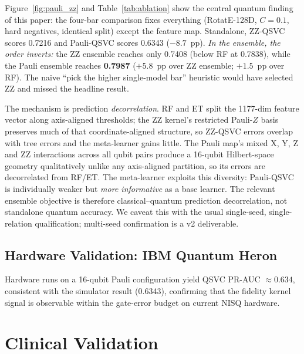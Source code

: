 Figure~\ref{fig:pauli_zz} and Table~\ref{tab:ablation} show the central
quantum finding of this paper: the four-bar comparison fixes everything
(RotatE-128D, $C{=}0.1$, hard negatives, identical split) except the feature
map. Standalone, ZZ-QSVC scores 0.7216 and Pauli-QSVC scores 0.6343
($-8.7$~pp). \emph{In the ensemble, the order inverts:} the ZZ ensemble
reaches only 0.7408 (below RF at 0.7838), while the Pauli ensemble reaches
\textbf{0.7987} ($+5.8$~pp over ZZ ensemble; $+1.5$~pp over RF). The naive
``pick the higher single-model bar'' heuristic would have selected ZZ and
missed the headline result.

The mechanism is prediction \emph{decorrelation}. RF and ET split the
1177-dim feature vector along axis-aligned thresholds; the ZZ kernel's
restricted Pauli-$Z$ basis preserves much of that coordinate-aligned
structure, so ZZ-QSVC errors overlap with tree errors and the meta-learner
gains little. The Pauli map's mixed X, Y, Z and ZZ interactions across all
qubit pairs produce a 16-qubit Hilbert-space geometry qualitatively unlike
any axis-aligned partition, so its errors are decorrelated from RF/ET. The
meta-learner exploits this diversity: Pauli-QSVC is individually weaker but
\emph{more informative} as a base learner. The relevant ensemble objective
is therefore classical--quantum prediction decorrelation, not standalone
quantum accuracy. We caveat this with the usual single-seed, single-relation
qualification; multi-seed confirmation is a v2 deliverable.

\subsection{Hardware Validation: IBM Quantum Heron}

Hardware runs on a 16-qubit Pauli configuration yield QSVC PR-AUC
${\approx}0.634$, consistent with the simulator result (0.6343), confirming
that the fidelity kernel signal is observable within the gate-error budget on current NISQ
hardware.
\fi

\section{Clinical Validation}
\label{sec:clinical}

